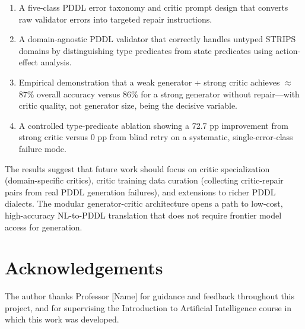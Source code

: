\documentclass{article}
\begin{document}
\begin{enumerate}[leftmargin=1.5em]
  \item A five-class PDDL error taxonomy and critic prompt design that converts
        raw validator errors into targeted repair instructions.
  \item A domain-agnostic PDDL validator that correctly handles untyped STRIPS
        domains by distinguishing type predicates from state predicates using
        action-effect analysis.
  \item Empirical demonstration that a weak generator + strong critic achieves
        $\approx$87\% overall accuracy versus 86\% for a strong generator without
        repair---with critic quality, not generator size, being the decisive variable.
  \item A controlled type-predicate ablation showing a 72.7 pp improvement from
        strong critic versus 0 pp from blind retry on a systematic, single-error-class
        failure mode.
\end{enumerate}

The results suggest that future work should focus on critic specialization (domain-specific
critics), critic training data curation (collecting critic-repair pairs from
real PDDL generation failures), and extensions to richer PDDL dialects.  The
modular generator-critic architecture opens a path to low-cost, high-accuracy NL-to-PDDL
translation that does not require frontier model access for generation.

\section*{Acknowledgements}

The author thanks Professor [Name] for guidance and feedback throughout this project,
and for supervising the Introduction to Artificial Intelligence course in which this
work was developed.
\end{document}
